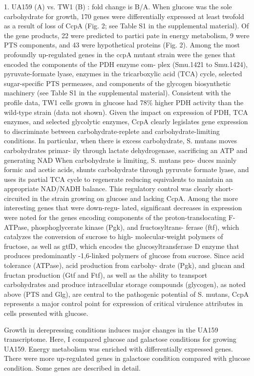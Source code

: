 \documentclass{article}
\begin{document}
1. UA159 (A) vs. TW1 (B) : fold change is B/A.
When glucose was the sole carbohydrate for growth, 170 genes were differentially
expressed at least twofold as a result of loss of CcpA (Fig. 2; see Table S1 in
the supplemental material). Of the gene products, 22 were predicted to partici
pate in energy metabolism, 9 were PTS components, and 43 were hypothetical
proteins (Fig. 2). Among the most profoundly up-regulated genes in the ccpA
mutant strain were the genes that encoded the components of the PDH enzyme com-
plex (Smu.1421 to Smu.1424), pyruvate-formate lyase, enzymes in the
tricarboxylic acid (TCA) cycle, selected sugar-specific PTS permeases, and
components of the glycogen biosynthetic machinery (see Table S1 in the
supplemental material). 
Consistent with the profile data, TW1 cells grown in glucose had 78\% higher
PDH activity than the wild-type strain (data not shown). Given the impact on
expression of PDH, TCA enzymes, and selected glycolytic enzymes, CcpA clearly
legislates gene expression to discriminate between carbohydrate-replete and
carbohydrate-limiting conditions. In particular, when there is excess
carbohydrate, S. mutans moves carbohydrates primar- ily through lactate
dehydrogenase, sacrificing an ATP and generating NAD When carbohydrate is
limiting, S. mutans pro- duces mainly formic and acetic acids, shunts
carbohydrate through pyruvate formate lyase, and uses its partial TCA cycle to
regenerate reducing equivalents to maintain an appropriate NAD/NADH balance.
This regulatory control was clearly short-circuited in the strain growing on
glucose and lacking CcpA.
Among the more interesting genes that were down-regu- lated, significant
decreases in expression were noted for the genes encoding components of the
proton-translocating F-ATPase, phosphoglycerate kinase (Pgk), and
fructosyltrans- ferase (ftf), which catalyzes the conversion of sucrose to high-
molecular-weight polymers of fructose, as well as gtfD, which encodes the
glucosyltransferase D enzyme that produces predominantly -1,6-linked polymers
of glucose from sucrose. Since acid tolerance (ATPase), acid production from
carbohy- drate (Pgk), and glucan and fructan production (Gtf and Ftf), as well
as the ability to transport carbohydrates and produce intracellular storage
compounds (glycogen), as noted above (PTS and Glg), are central to the
pathogenic potential of S. mutans, CcpA represents a major control point for
expression of critical virulence attributes in cells presented with glucose.

Growth in derepressing conditions induces major changes in the UA159
transcriptome. Here, I compared glucose and galactose conditions for growing
UA159. Energy metabolism was enriched with differentially expressed genes. There
were more up-regulated genes in galactose condition compared with glucose
condition. Some genes are described in detail. 
\end{document}
